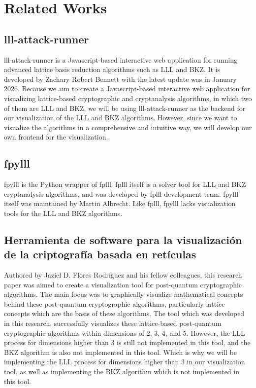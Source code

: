 \documentclass[runningheads]{llncs}
\begin{document}
\section{Related Works}

\subsection{lll-attack-runner}
lll-attack-runner is a Javascript-based interactive web application for running advanced lattice basis reduction algorithms such as LLL and BKZ. It is developed by Zachary Robert Bennett with the latest update was in January 2026. Because we aim to create a Javascript-based interactive web application for visualizing lattice-based cryptographic and cryptanalysis algorithms, in which two of them are LLL and BKZ, we will be using lll-attack-runner as the backend for our visualization of the LLL and BKZ algorithms. However, since we want to visualize the algorithms in a comprehensive and intuitive way, we will develop our own frontend for the visualization.

\subsection{fpylll}
fpylll is the Python wrapper of fplll. fplll itself is a solver tool for LLL and BKZ cryptanalysis algorithms, and was developed by fplll development team. fpylll itself was maintained by Martin Albrecht. Like fplll, fpylll lacks visualization tools for the LLL and BKZ algorithms. 

\subsection{Herramienta de software para la visualización
de la criptografía basada en retículas}
Authored by Jaziel D. Flores Rodríguez and his fellow colleagues, this research paper was aimed to create a visualization tool for post-quantum cryptographic algorithms. The main focus was to graphically visualize mathematical concepts behind these post-quantum cryptographic algorithms, particularly lattice concepts which are the basis of these algorithms. The tool which was developed in this research, successfully visualizes these lattice-based post-quantum cryptographic algorithms within dimensions of 2, 3, 4, and 5. However, the LLL process for dimensions higher than 3 is still not implemented in this tool, and the BKZ algorithm is also not implemented in this tool.
Which is why we will be implementing the LLL process for dimensions higher than 3 in our visualization tool, as well as implementing the BKZ algorithm which is not implemented in this tool.
\end{document}
